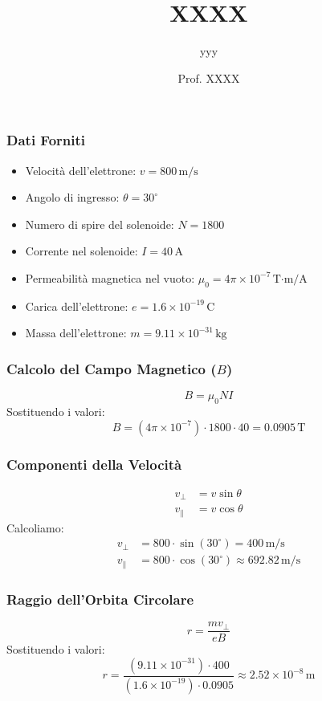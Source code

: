 \documentclass{beamer}
\title{XXXX}
\subtitle{yyy}
\author{Prof. XXXX}
\institute{Liceo da Vinci}
\date{}
\begin{document}
\frame{\titlepage}

\begin{frame}
\frametitle{Dati Forniti}
\begin{itemize}
    \item Velocità dell'elettrone: \(v = 800 \, \text{m/s}\)
    \item Angolo di ingresso: \(\theta = 30^\circ\)
    \item Numero di spire del solenoide: \(N = 1800\)
    \item Corrente nel solenoide: \(I = 40 \, \text{A}\)
    \item Permeabilità magnetica nel vuoto: \(\mu_0 = 4 \pi \times 10^{-7} \, \text{T·m/A}\)
    \item Carica dell'elettrone: \(e = 1.6 \times 10^{-19} \, \text{C}\)
    \item Massa dell'elettrone: \(m = 9.11 \times 10^{-31} \, \text{kg}\)
\end{itemize}
\end{frame}

\begin{frame}
\frametitle{Calcolo del Campo Magnetico (\(B\))}
\begin{equation}
B = \mu_0 N I
\end{equation}
Sostituendo i valori:
\begin{equation}
B = (4 \pi \times 10^{-7}) \cdot 1800 \cdot 40 = 0.0905 \, \text{T}
\end{equation}
\end{frame}

\begin{frame}
\frametitle{Componenti della Velocità}
\begin{align}
v_\perp &= v \sin \theta \\
v_\parallel &= v \cos \theta
\end{align}
Calcoliamo:
\begin{align}
v_\perp &= 800 \cdot \sin(30^\circ) = 400 \, \text{m/s} \\
v_\parallel &= 800 \cdot \cos(30^\circ) \approx 692.82 \, \text{m/s}
\end{align}
\end{frame}

\begin{frame}
\frametitle{Raggio dell'Orbita Circolare}
\begin{equation}
r = \frac{m v_\perp}{e B}
\end{equation}
Sostituendo i valori:
\begin{equation}
r = \frac{(9.11 \times 10^{-31}) \cdot 400}{(1.6 \times 10^{-19}) \cdot 0.0905} \approx 2.52 \times 10^{-8} \, \text{m}
\end{equation}
\end{frame}
\end{document}
